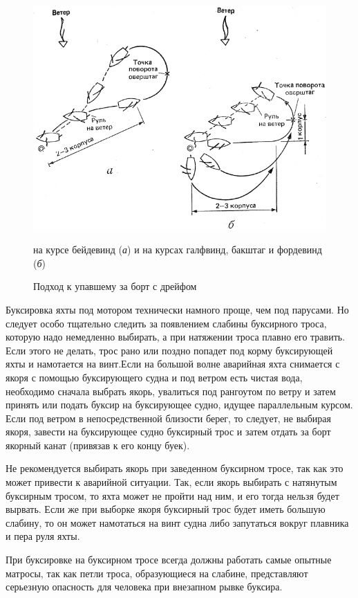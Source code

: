 \documentclass[a4paper, 12pt, twoside, final, book, russian, fittopage, cyremdash]{ncc}
\begin{document}
\begin{figure}[htb]
  \centering{}
  \includegraphics[scale=1.3]{0142P}
  \caption{Подход к упавшему за борт с дрейфом}
  \label{fig:142}
  \small
  \centering{}
  на курсе бейдевинд (\textit{а}) и на курсах галфвинд, бакштаг и фордевинд (\textit{б})
\end{figure}

Буксировка яхты под мотором технически намного проще, чем под парусами. Но следует особо тщательно следить за появлением слабины буксирного троса, которую надо немедленно выбирать, а при натяжении троса плавно его травить. Если этого не делать, трос рано или поздно попадет под корму буксирующей яхты и намотается на винт.Если на большой волне аварийная яхта снимается с якоря с помощью буксирующего судна и под ветром есть чистая вода, необходимо сначала выбрать якорь, увалиться под рангоутом по ветру и затем принять или подать буксир на буксирующее судно, идущее параллельным курсом. Если под ветром в непосредственной близости берег, то следует, не выбирая якоря, завести на буксирующее судно буксирный трос и затем отдать за борт якорный канат (привязав к его концу буек).

Не рекомендуется выбирать якорь при заведенном буксирном тросе, так как это может привести к аварийной ситуации. Так, если якорь выбирать с натянутым буксирным тросом, то яхта может не пройти над ним, и его тогда нельзя будет вырвать. Если же при выборке якоря буксирный трос будет иметь большую слабину, то он может намотаться на винт судна либо запутаться вокруг плавника и пера руля яхты.

При буксировке на буксирном тросе всегда должны работать самые опытные матросы, так как петли троса, образующиеся на слабине, представляют серьезную опасность для человека при внезапном рывке буксира. 
\end{document}
